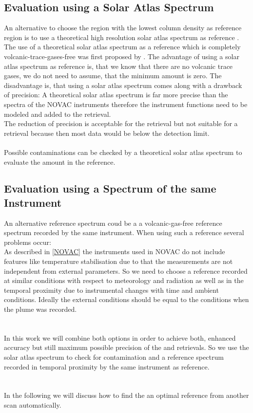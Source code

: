 \documentclass  [
  paper    = a4,
  BCOR     = 10mm,
  twoside,
  fontsize = 12pt,
  fleqn,
  toc      = bibnumbered,
  toc      = listofnumbered,
  numbers  = noendperiod,
  headings = normal,
  listof   = leveldown,
  version  = 3.03
]                                       {scrreprt}
\begin{document}
	\subsection*{Evaluation using a Solar Atlas Spectrum \label{kuruz}}
	An alternative to choose the region with the lowest column density as reference region is to use a theoretical high resolution solar atlas spectrum as reference \cite{chance2010improved}.
	The use of a theoretical solar atlas spectrum as a reference which is completely volcanic-trace-gases-free was first proposed by \cite{lubcke2014bro}.
	The advantage of using a solar atlas spectrum as reference is, that we know that there are no volcanic trace gases, we do not need to assume, that the minimum  amount is zero. The disadvantage is, that using a solar atlas spectrum comes along with a drawback of precision: A theoretical solar atlas spectrum is far more precise than the spectra of the NOVAC instruments therefore the instrument functions need to be modeled and added to the retrieval.\\ 
	The reduction of precision is acceptable for the
	 retrieval but not suitable for a  retrieval because then most data would be below the detection limit.\\
%
\\
%
	Possible contaminations can be checked
	by a theoretical solar atlas spectrum to evaluate the  amount in the reference.

	\subsection*{Evaluation using a Spectrum of the same Instrument}
	An alternative reference spectrum coud be a a volcanic-gas-free reference
	spectrum recorded by the same instrument. When using such a reference several problems occur:\\
	As described in \cref{NOVAC} the instruments used in NOVAC do not include features like temperature stabilisation due to that the measurements are not independent from external parameters. 
	So we need to choose a reference recorded at similar conditions with respect to meteorology and	radiation as well as in the temporal proximity due to instrumental changes with time and ambient conditions. Ideally the external conditions should be equal to the conditions when the plume was recorded.\\
	\\
	\\
	In this work we will combine both options in order to
	achieve both, enhanced accuracy but still maximum possible precision of
	the  and  retrievals. So we use the solar atlas spectrum to check for 
	contamination and a reference spectrum recorded in temporal proximity by the same instrument as reference.\\
	\\
	\\
	In the following we will discuss how to find the an optimal reference from another scan automatically.
	
\end{document}
